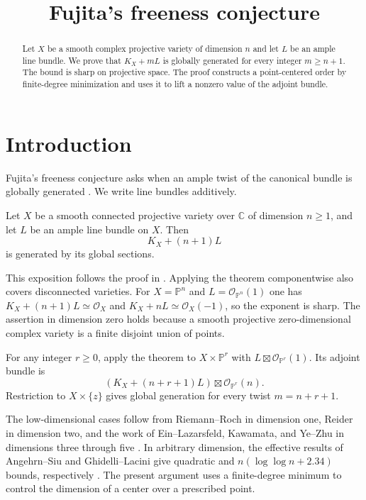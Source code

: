 \documentclass[11pt,a4paper]{amsart}
\title{Fujita's freeness conjecture}
\author{}
\date{}
\begin{document}
\begin{abstract}
Let $X$ be a smooth complex projective variety of dimension $n$ and let $L$ be an ample line bundle. We prove that $K_X+mL$ is globally generated for every integer $m\geq n+1$. The bound is sharp on projective space. The proof constructs a point-centered order by finite-degree minimization and uses it to lift a nonzero value of the adjoint bundle.
\end{abstract}

\maketitle

\section{Introduction}\label{sec:introduction}

Fujita's freeness conjecture asks when an ample twist of the canonical bundle is globally generated \cite{fujita1987}. We write line bundles additively.

\begin{maintheorem}\label{thm:main}
Let $X$ be a smooth connected projective variety over $\mathbb{C}$ of dimension $n\geq 1$, and let $L$ be an ample line bundle on $X$. Then
\[
                    K_X+(n+1)L
\]
is generated by its global sections.
\end{maintheorem}

This exposition follows the proof in \cite{OpenAIMathSource}. Applying the theorem componentwise also covers disconnected varieties. For $X=\mathbb{P}^n$ and $L=\mathcal{O}_{\mathbb{P}^n}(1)$ one has $K_X+(n+1)L\simeq\mathcal{O}_X$ and $K_X+nL\simeq\mathcal{O}_X(-1)$, so the exponent is sharp. The assertion in dimension zero holds because a smooth projective zero-dimensional complex variety is a finite disjoint union of points.

For any integer $r\geq0$, apply the theorem to $X\times\mathbb{P}^r$ with $L\boxtimes\mathcal{O}_{\mathbb{P}^r}(1)$. Its adjoint bundle is
\[
 (K_X+(n+r+1)L)\boxtimes\mathcal{O}_{\mathbb{P}^r}(n).
\]
Restriction to $X\times\{z\}$ gives global generation for every twist $m=n+r+1$.

The low-dimensional cases follow from Riemann--Roch in dimension one, Reider in dimension two, and the work of Ein--Lazarsfeld, Kawamata, and Ye--Zhu in dimensions three through five \cite{reider1988,einlazarsfeld1993,kawamata1997,yezhu2020}. In arbitrary dimension, the effective results of Angehrn--Siu and Ghidelli--Lacini give quadratic and $n(\log\log n+2.34)$ bounds, respectively \cite{angehrnsiu1995}\cite[Theorem~1.1]{ghidellilacini2024}. The present argument uses a finite-degree minimum to control the dimension of a center over a prescribed point.
\end{document}
